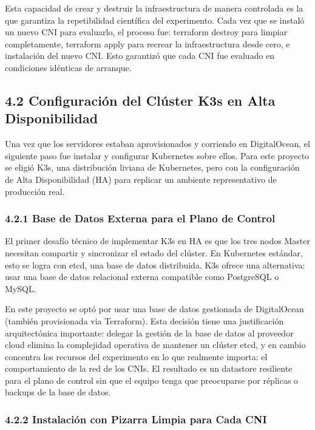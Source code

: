 \documentclass[journal]{IEEEtran}
\begin{document}
Esta capacidad de crear y destruir la infraestructura de manera controlada es la que garantiza la repetibilidad científica del experimento. Cada vez que se instaló un nuevo CNI para evaluarlo, el proceso fue: terraform destroy para limpiar completamente, terraform apply para recrear la infraestructura desde cero, e instalación del nuevo CNI. Esto garantizó que cada CNI fue evaluado en condiciones idénticas de arranque.

\subsection{4.2 Configuración del Clúster K3s en Alta Disponibilidad}

Una vez que los servidores estaban aprovisionados y corriendo en DigitalOcean, el siguiente paso fue instalar y configurar Kubernetes sobre ellos. Para este proyecto se eligió K3s, una distribución liviana de Kubernetes, pero con la configuración de Alta Disponibilidad (HA) para replicar un ambiente representativo de producción real.

\subsubsection{4.2.1 Base de Datos Externa para el Plano de Control}

El primer desafío técnico de implementar K3s en HA es que los tres nodos Master necesitan compartir y sincronizar el estado del clúster. En Kubernetes estándar, esto se logra con etcd, una base de datos distribuida. K3s ofrece una alternativa: usar una base de datos relacional externa compatible como PostgreSQL o MySQL.

En este proyecto se optó por usar una base de datos gestionada de DigitalOcean (también provisionada via Terraform). Esta decisión tiene una justificación arquitectónica importante: delegar la gestión de la base de datos al proveedor cloud elimina la complejidad operativa de mantener un clúster etcd, y en cambio concentra los recursos del experimento en lo que realmente importa: el comportamiento de la red de los CNIs. El resultado es un datastore resiliente para el plano de control sin que el equipo tenga que preocuparse por réplicas o backups de la base de datos.

\subsubsection{4.2.2 Instalación con Pizarra Limpia para Cada CNI}
\end{document}
